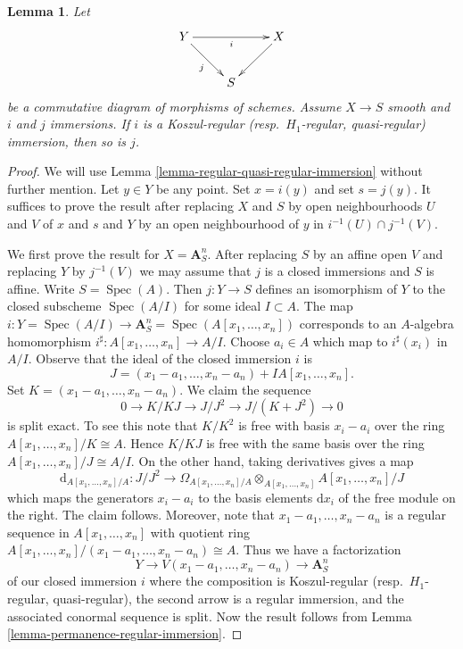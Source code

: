 \documentclass[10pt,a4paper]{amsart}
\theoremstyle{plain}
\newtheorem{lemma}[subsection]{Lemma}
\theoremstyle{definition}
\theoremstyle{remark}
\numberwithin{equation}{subsection}
\def\Spec{\mathop{\mathrm{Spec}}}
\begin{document}
\begin{lemma}
\label{lemma-push-regular-immersion-thru-smooth}
Let
$$
\xymatrix{
Y \ar[rd]_j \ar[rr]_i & & X \ar[ld] \\
& S
}
$$
be a commutative diagram of morphisms of schemes.
Assume $X \to S$ smooth and $i$ and $j$ immersions.
If $i$ is a Koszul-regular (resp.\ $H_1$-regular, quasi-regular)
immersion, then so is $j$.
\end{lemma}

\begin{proof}
We will use Lemma \ref{lemma-regular-quasi-regular-immersion}
without further mention.
Let $y \in Y$ be any point. Set $x = i(y)$ and set $s = j(y)$.
It suffices to prove the result after replacing $X$ and $S$ by open
neighbourhoods $U$ and $V$ of $x$ and $s$ and $Y$ by an open neighbourhood
of $y$ in $i^{-1}(U) \cap j^{-1}(V)$.

\medskip\noindent
We first prove the result for $X = \mathbf{A}^n_S$. After replacing $S$
by an affine open $V$ and replacing $Y$ by $j^{-1}(V)$ we may assume that
$j$ is a closed immersions and $S$ is affine. Write $S = \Spec(A)$.
Then $j : Y \to S$ defines an isomorphism of $Y$ to the closed subscheme
$\Spec(A/I)$ for some ideal $I \subset A$. The map
$i : Y = \Spec(A/I) \to
\mathbf{A}^n_S = \Spec(A[x_1, \ldots, x_n])$
corresponds to an $A$-algebra homomorphism
$i^\sharp : A[x_1, \ldots, x_n] \to A/I$.
Choose $a_i \in A$ which map to $i^\sharp(x_i)$ in $A/I$.
Observe that the ideal of the closed immersion $i$ is
$$
J = (x_1 - a_1, \ldots, x_n - a_n) + IA[x_1, \ldots, x_n].
$$
Set $K = (x_1 - a_1, \ldots, x_n - a_n)$. We claim the sequence
$$
0 \to K/KJ \to J/J^2 \to J/(K + J^2) \to 0
$$
is split exact. To see this note that $K/K^2$ is free with basis
$x_i - a_i$ over the ring $A[x_1, \ldots, x_n]/K \cong A$.
Hence $K/KJ$ is free with the same basis over the ring
$A[x_1, \ldots, x_n]/J \cong A/I$. On the other hand, taking derivatives
gives a map
$$
\text{d}_{A[x_1, \ldots, x_n]/A} :
J/J^2
\longrightarrow
\Omega_{A[x_1, \ldots, x_n]/A} \otimes_{A[x_1, \ldots, x_n]}
A[x_1, \ldots, x_n]/J
$$
which maps the generators $x_i - a_i$ to the basis elements $\text{d}x_i$
of the free module on the right. The claim follows. Moreover, note that
$x_1 - a_1, \ldots, x_n - a_n$ is a regular sequence in
$A[x_1, \ldots, x_n]$ with quotient ring
$A[x_1, \ldots, x_n]/(x_1 - a_1, \ldots, x_n - a_n) \cong A$.
Thus we have a factorization
$$
Y \to V(x_1 - a_1, \ldots, x_n - a_n) \to \mathbf{A}^n_S
$$
of our closed immersion $i$ where the composition is
Koszul-regular (resp.\ $H_1$-regular, quasi-regular),
the second arrow is a regular immersion, and the associated conormal
sequence is split. Now the result follows from
Lemma \ref{lemma-permanence-regular-immersion}.


\end{proof}
\end{document}
